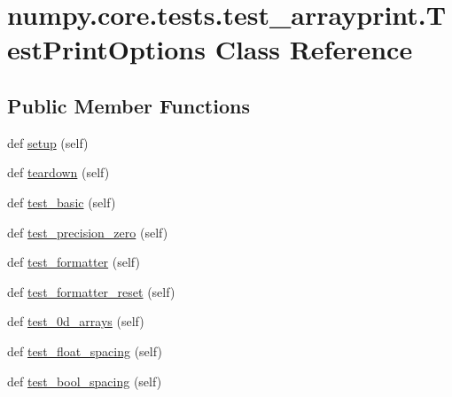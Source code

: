 \hypertarget{classnumpy_1_1core_1_1tests_1_1test__arrayprint_1_1TestPrintOptions}{}\section{numpy.\+core.\+tests.\+test\+\_\+arrayprint.\+Test\+Print\+Options Class Reference}
\label{classnumpy_1_1core_1_1tests_1_1test__arrayprint_1_1TestPrintOptions}
\subsection*{Public Member Functions}
\begin{DoxyCompactItemize}
\item 
def \hyperlink{classnumpy_1_1core_1_1tests_1_1test__arrayprint_1_1TestPrintOptions_a511fa8512a0c14d0e6043b62e8690464}{setup} (self)
\item 
def \hyperlink{classnumpy_1_1core_1_1tests_1_1test__arrayprint_1_1TestPrintOptions_afe07c3e0c43458e25e99eb23c6935f47}{teardown} (self)
\item 
def \hyperlink{classnumpy_1_1core_1_1tests_1_1test__arrayprint_1_1TestPrintOptions_ae20190b6d176cf1e5fc25aad7edcfb99}{test\+\_\+basic} (self)
\item 
def \hyperlink{classnumpy_1_1core_1_1tests_1_1test__arrayprint_1_1TestPrintOptions_a82ba0445f3deb468b4640b722c0d4e8b}{test\+\_\+precision\+\_\+zero} (self)
\item 
def \hyperlink{classnumpy_1_1core_1_1tests_1_1test__arrayprint_1_1TestPrintOptions_a7e69ec9600fbcc252a46328cf97f2f02}{test\+\_\+formatter} (self)
\item 
def \hyperlink{classnumpy_1_1core_1_1tests_1_1test__arrayprint_1_1TestPrintOptions_a30f428785ddaf64f6e9a55631e2f7657}{test\+\_\+formatter\+\_\+reset} (self)
\item 
def \hyperlink{classnumpy_1_1core_1_1tests_1_1test__arrayprint_1_1TestPrintOptions_a5ae6f7f6250fd033dcdfd6199359670d}{test\+\_\+0d\+\_\+arrays} (self)
\item 
def \hyperlink{classnumpy_1_1core_1_1tests_1_1test__arrayprint_1_1TestPrintOptions_aabe7eb840772f5fdff886f236a675bc7}{test\+\_\+float\+\_\+spacing} (self)
\item 
def \hyperlink{classnumpy_1_1core_1_1tests_1_1test__arrayprint_1_1TestPrintOptions_a069d162cd2a3cecd2ed8aac0122ef65b}{test\+\_\+bool\+\_\+spacing} (self)
\item 

\end{DoxyCompactItemize}
